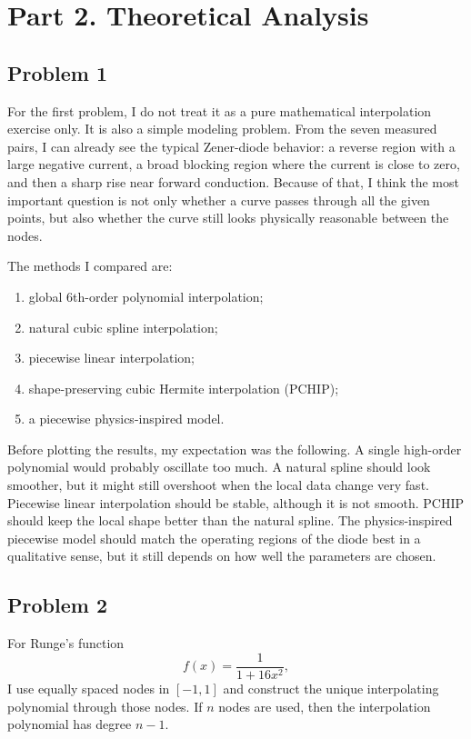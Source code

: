 \documentclass[12pt,a4paper]{article}
\begin{document}
\section{Part 2. Theoretical Analysis}

\subsection{Problem 1}

For the first problem, I do not treat it as a pure mathematical interpolation exercise only. It is also a simple modeling problem. From the seven measured pairs, I can already see the typical Zener-diode behavior: a reverse region with a large negative current, a broad blocking region where the current is close to zero, and then a sharp rise near forward conduction. Because of that, I think the most important question is not only whether a curve passes through all the given points, but also whether the curve still looks physically reasonable between the nodes.

The methods I compared are:
\begin{enumerate}[label=(\arabic*)]
    \item global 6th-order polynomial interpolation;
    \item natural cubic spline interpolation;
    \item piecewise linear interpolation;
    \item shape-preserving cubic Hermite interpolation (PCHIP);
    \item a piecewise physics-inspired model.
\end{enumerate}

Before plotting the results, my expectation was the following. A single high-order polynomial would probably oscillate too much. A natural spline should look smoother, but it might still overshoot when the local data change very fast. Piecewise linear interpolation should be stable, although it is not smooth. PCHIP should keep the local shape better than the natural spline. The physics-inspired piecewise model should match the operating regions of the diode best in a qualitative sense, but it still depends on how well the parameters are chosen.

\subsection{Problem 2}

For Runge's function
\[
    f(x)=\frac{1}{1+16x^2},
\]
I use equally spaced nodes in $[-1,1]$ and construct the unique interpolating polynomial through those nodes. If $n$ nodes are used, then the interpolation polynomial has degree $n-1$.
\end{document}

